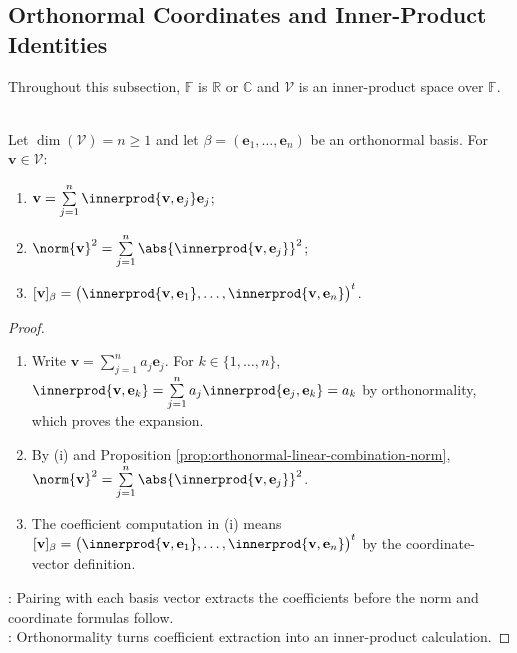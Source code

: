 \subsection{Orthonormal Coordinates and Inner-Product Identities}

Throughout this subsection, $\mathbb{F}$ is $\mathbb{R}$ or $\mathbb{C}$ and $\mathcal{V}$ is an inner-product space over $\mathbb{F}$.

\begin{theorem} \label{thm:orthonormal-basis-coordinates} \\
Let $\dim(\mathcal{V})=n\geq1$ and let $\beta=(\mathbf{e}_1,\ldots,\mathbf{e}_n)$ be an orthonormal basis. For $\mathbf{v}\in\mathcal{V}$:
\begin{enumerate}[label=(\roman*)]
\setlength{\itemsep}{0pt}
\item $\mathbf{v}=\sum\limits_{j=1}^{n}\innerprod{\mathbf{v},\mathbf{e}_j}\mathbf{e}_j$;
\item $\norm{\mathbf{v}}^2=\sum\limits_{j=1}^{n}\abs{\innerprod{\mathbf{v},\mathbf{e}_j}}^2$;
\item $[\mathbf{v}]_{\beta}=\bigl(\innerprod{\mathbf{v},\mathbf{e}_1},\ldots,\innerprod{\mathbf{v},\mathbf{e}_n}\bigr)^t$.
\end{enumerate}
\begin{proof}
\begin{enumerate}[label=(\roman*)]
\setlength{\itemsep}{0pt}
\item Write $\mathbf{v}=\sum\limits_{j=1}^{n}a_j\mathbf{e}_j$. For $k\in\{1,\ldots,n\}$, $\innerprod{\mathbf{v},\mathbf{e}_k}=\sum\limits_{j=1}^{n}a_j\innerprod{\mathbf{e}_j,\mathbf{e}_k}=a_k$ by orthonormality, which proves the expansion.
\item By (i) and Proposition \ref{prop:orthonormal-linear-combination-norm}, $\norm{\mathbf{v}}^2=\sum\limits_{j=1}^{n}\abs{\innerprod{\mathbf{v},\mathbf{e}_j}}^2$.
\item The coefficient computation in (i) means $[\mathbf{v}]_{\beta}=\bigl(\innerprod{\mathbf{v},\mathbf{e}_1},\ldots,\innerprod{\mathbf{v},\mathbf{e}_n}\bigr)^t$ by the coordinate-vector definition.
\end{enumerate}
: Pairing with each basis vector extracts the coefficients before the norm and coordinate formulas follow.\\
: Orthonormality turns coefficient extraction into an inner-product calculation.
\end{proof}
\end{theorem}

